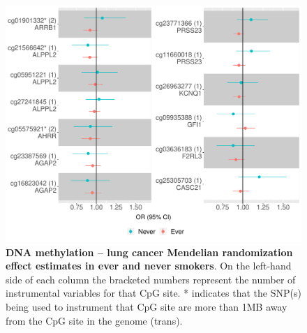 \documentclass[11pt,oneside]{bristolthesis}
\begin{document}
\begin{figure}

{\centering \includegraphics[width=1\linewidth]{figure/07-dnam_lungcancer_mr/sup_fig2-never_v_ever_smokers} 

}

\caption[DNA methylation -- lung cancer Mendelian randomization effect estimates in ever and never smokers]{\textbf{DNA methylation -- lung cancer Mendelian randomization effect estimates in ever and never smokers}. On the left-hand side of each column the bracketed numbers represent the number of instrumental variables for that CpG site. * indicates that the SNP(s) being used to instrument that CpG site are more than 1MB away from the CpG site in the genome (trans).}\label{fig:sup-fig2-07}
\end{figure}
\end{document}
